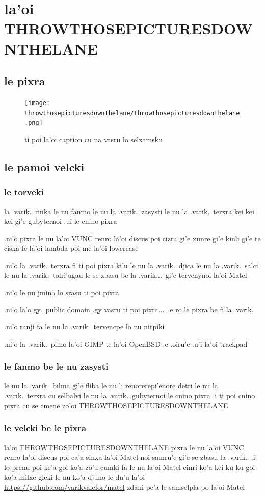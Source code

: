 \documentclass{report}
\begin{document}
\chapter{la'oi THROWTHOSEPICTURESDOWNTHELANE}
\section{le pixra}
\begin{figure}[ht]
	\centering
	\texttt{[image: throwthosepicturesdownthelane/throwthosepicturesdownthelane.png]}
	\caption[center]{ti poi la'oi caption cu na vasru lo selxamsku}
\end{figure}
\section{le pamoi velcki}
\subsection{le torveki}
la .varik.\ rinka le nu fanmo le nu la .varik.\ zasysti le nu la .varik.\ terxra kei kei kei gi'e gubyternoi .ui le cnino pixra

.ni'o pixra le nu la'oi VUNC renro la'oi discus poi cizra gi'e xunre gi'e kinli gi'e te ciska fe la'oi lambda poi me la'oi lowercase

.ni'o la .varik.\ terxra fi ti poi pixra ki'u le nu la .varik.\ djica le nu la .varik.\ salci le nu la .varik.\ tolri'ugau le se zbasu be la .varik...\ gi'e tervenynoi la'oi Matel

.ni'o le nu jmina lo srasu ti poi pixra

.ni'o la'o gy.\ public domain .gy vasru ti poi pixra...\ .e ro le pixra be fi la .varik.

.ni'o ranji fa le nu la .varik.\ tervencpe lo nu nitpiki

.ni'o la .varik.\ pilno la'oi GIMP .e la'oi OpenBSD .e .oiru'e .u'i la'oi trackpad

\subsection{le fanmo be le nu zasysti}
le nu la .varik.\ bilma gi'e fliba le nu li renorerepi'enore detri le nu la .varik.\ terxra cu selbalvi le nu la .varik.\ gubyternoi le cnino pixra  .i ti poi cnino pixra cu se cmene zo'oi THROWTHOSEPICTURESDOWNTHELANE

\subsection{le velcki be le pixra}
la'oi THROWTHOSEPICTURESDOWNTHELANE pixra le nu la'oi VUNC renro la'oi discus poi ca'a sinxa la'oi Matel noi samru'e gi'e se zbasu la .varik.\  .i lo prenu poi ke'a goi ko'a zo'u cumki fa le nu la'oi Matel cinri ko'a kei ku ku goi ko'a milxe gleki le nu ko'a djuno le du'u la'oi \url{https://github.com/varikvalefor/matel} zdani pe'a le samselpla po la'oi Matel
\end{document}
